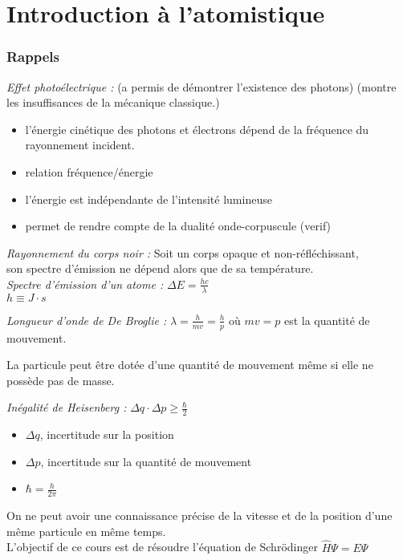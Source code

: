 \documentclass[../main.tex]{subfile}
\begin{document}
\part{Introduction à l'atomistique}

\section{Rappels}

\emph{Effet photoélectrique :} (a permis de démontrer l'existence des photons) (montre les insuffisances de la mécanique classique.)
\begin{itemize}
         \item l'énergie cinétique des photons et électrons dépend de la fréquence du rayonnement incident.
         \item relation fréquence/énergie 
         \item l'énergie est indépendante de l'intensité lumineuse
         \item permet de rendre compte de la dualité onde-corpuscule (verif)
\end{itemize}


\emph{Rayonnement du corps noir :}
   Soit un corps opaque et non-réfléchissant, \\
   son spectre d'émission ne dépend alors que de sa température.\\

\emph{Spectre d'émission d'un atome :} $\Delta E = \frac{hc}{\lambda}$\\
$h \equiv J \cdot s$


\emph{Longueur d'onde de De Broglie :} $\lambda = \frac{h}{mv} = \frac{h}{p}$ où $mv = p$ est la quantité de mouvement. 
\begin{rema}
      La particule peut être dotée d'une quantité de mouvement même si elle ne possède pas de masse.
\end{rema}


\emph{Inégalité de Heisenberg :} $\Delta q \cdot \Delta p \geq \frac{\hbar}{2}$\\
\begin{itemize}
         \item $\Delta q$, incertitude sur la position
         \item $\Delta p$, incertitude sur la quantité de mouvement
         \item $\hbar = \frac{h}{2\pi}$
\end{itemize}
   On ne peut avoir une connaissance précise de la vitesse et de la position d'une même particule en même temps.\\


   L'objectif de ce cours est de résoudre l'équation de Schrödinger $\hat{H}\Psi = E \Psi$

\newpage
\end{document}
